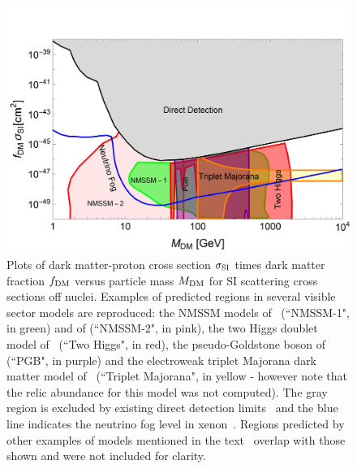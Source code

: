 \begin{figure}[t]
\begin{center}
\includegraphics[width=0.80\columnwidth]{figures/sigmap_visible_plot.jpg}
\caption{Plots of dark matter-proton cross section $\sigma_{\rm SI}$  times dark matter fraction $f_{\rm DM}$ versus particle mass $M_{\rm DM}$ for SI scattering cross sections off nuclei. Examples of predicted regions in several visible sector models are reproduced: the NMSSM models of~\cite{Lopez-Fogliani:2021qpq} (``NMSSM-1", in green) and of \cite{Wang:2020xta} (``NMSSM-2", in pink), the two Higgs doublet model of~\cite{Cabrera:2019gaq} (``Two Higgs", in red), the pseudo-Goldstone boson  of~\cite{Alanne:2020jwx} (``PGB", in purple) and the electroweak triplet Majorana dark matter model of~\cite{Chen:2018uqz} (``Triplet Majorana", in yellow - however note that the relic abundance for this model was not computed). The gray region is excluded by existing direct detection limits~\cite{Evans:2017kti} and the blue line indicates the neutrino fog level in xenon~\cite{Billard:2013qya,Ruppin:2014bra}. Regions predicted by other examples of models mentioned in the text~\cite{VanBeekveld:2021tgn, Mukherjee:2022kff, Khater:2021wcx, Chen:2018uqz, Chen:2019gtm,Berlin:2015ymu} overlap with those shown and were not included for clarity.}
\label{fig:sample_SI-VisibleSector}
\end{center}
\end{figure}
 
